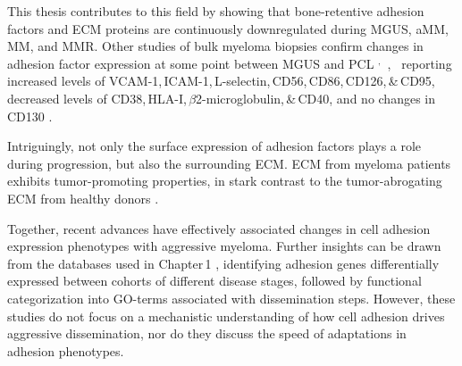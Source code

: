 This thesis contributes to this field by showing that bone-retentive adhesion
factors and \ac{ECM} proteins are continuously downregulated during \ac{MGUS},
\ac{aMM}, \ac{MM}, and \ac{MMR}. Other studies of bulk myeloma biopsies confirm
changes in adhesion factor expression at some point between \ac{MGUS} and
\ac{PCL}%
%
$^,$\,%
,~%
reporting %
increased levels of VCAM-1,\,ICAM-1,\,L-selectin,\,CD56,\,CD86,\,CD126,\,\&\,CD95, %
decreased levels of CD38,\,HLA-I,\,$\beta$2-microglobulin,\,\&\,CD40, and %
no changes in CD130 %
\cite{terposIncreasedCirculatingVCAM12016, perez-andresClonalPlasmaCells2005}.

Intriguingly, not only the surface expression of adhesion factors plays a role
during progression, but also the surrounding \ac{ECM}. \ac{ECM} from myeloma
patients exhibits tumor-promoting properties, in stark contrast to the
tumor-abrogating \ac{ECM} from healthy donors
\cite{ibraheemBMMSCsderivedECMModifies2019}.

Together, recent advances have effectively associated changes in cell adhesion
expression phenotypes with aggressive myeloma. Further insights can be drawn
from the databases used in Chapter\,1
\cite{seckingerCD38ImmunotherapeuticTarget2018}, identifying adhesion genes
differentially expressed between cohorts of different disease stages, followed by
functional categorization into GO-terms associated with dissemination steps.
However, these studies do not focus on a mechanistic understanding of how cell
adhesion drives aggressive dissemination, nor do they discuss the speed of
adaptations in adhesion phenotypes.


